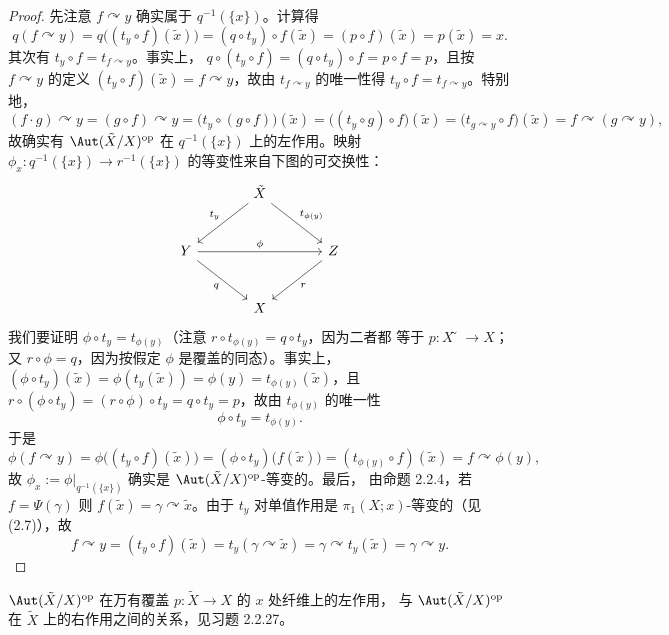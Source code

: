 \begin{proof}
先注意 $f\curvearrowright y$ 确实属于 $q^{-1}(\{x\})$。计算得
\begin{equation}\label{eq:2.11}
q(f\curvearrowright y)
=q\bigl((t_y\circ f)(\tilde x)\bigr)
=(q\circ t_y)\circ f(\tilde x)
=(p\circ f)(\tilde x)=p(\tilde x)=x.
\end{equation}
其次有 $t_y\circ f=t_{f\curvearrowright y}$。事实上，
$q\circ(t_y\circ f)=(q\circ t_y)\circ f=p\circ f=p$，且按 $f\curvearrowright y$ 的定义
$(t_y\circ f)(\tilde x)=f\curvearrowright y$，故由 $t_{f\curvearrowright y}$ 的唯一性得
$t_y\circ f=t_{f\curvearrowright y}$。特别地，
\[
(f\cdot g)\curvearrowright y=(g\circ f)\curvearrowright y
=\bigl(t_y\circ(g\circ f)\bigr)(\tilde x)
=\bigl((t_y\circ g)\circ f\bigr)(\tilde x)
=\bigl(t_{g\curvearrowright y}\circ f\bigr)(\tilde x)
=f\curvearrowright(g\curvearrowright y),
\]
故确实有 $\Aut(\tilde X/X)^{\mathrm{op}}$ 在 $q^{-1}(\{x\})$ 上的左作用。映射
$\phi_x:q^{-1}(\{x\})\to r^{-1}(\{x\})$ 的等变性来自下图的可交换性：
\[
\begin{tikzcd}[column sep=large, row sep=large]
 & \tilde X \arrow[dl, "t_y"'] \arrow[dr, "t_{\phi(y)}"] & \\
 Y \arrow[dr, "q"'] \arrow[rr, "\phi"] & & Z \arrow[dl, "r"]\\
 & X &
\end{tikzcd}
\]
我们要证明 $\phi\circ t_y=t_{\phi(y)}$（注意 $r\circ t_{\phi(y)}=q\circ t_y$，因为二者都
等于 $p:X̃\to X$；又 $r\circ\phi=q$，因为按假定 $\phi$ 是覆盖的同态）。事实上，
$(\phi\circ t_y)(\tilde x)=\phi(t_y(\tilde x))=\phi(y)=t_{\phi(y)}(\tilde x)$，且
$r\circ(\phi\circ t_y)=(r\circ\phi)\circ t_y=q\circ t_y=p$，故由 $t_{\phi(y)}$ 的唯一性
\begin{equation}\label{eq:2.12}
\phi\circ t_y=t_{\phi(y)}.
\end{equation}
于是
\[
\phi(f\curvearrowright y)
=\phi\bigl((t_y\circ f)(\tilde x)\bigr)
=(\phi\circ t_y)\bigl(f(\tilde x)\bigr)
=(t_{\phi(y)}\circ f)(\tilde x)
=f\curvearrowright\phi(y),
\]
故 $\phi_x:=\phi|_{q^{-1}(\{x\})}$ 确实是 $\Aut(\tilde X/X)^{\mathrm{op}}$-等变的。最后，
由命题 2.2.4，若 $f=\Psi(\gamma)$ 则 $f(\tilde x)=\gamma\curvearrowright\tilde x$。由于
$t_y$ 对单值作用是 $\pi_1(X;x)$-等变的（见 (2.7)），故
\[
f\curvearrowright y=(t_y\circ f)(\tilde x)
=t_y(\gamma\curvearrowright\tilde x)
=\gamma\curvearrowright t_y(\tilde x)
=\gamma\curvearrowright y.
\]
\end{proof}

$\Aut(\tilde X/X)^{\mathrm{op}}$ 在万有覆盖 $p:\tilde X\to X$ 的 $x$ 处纤维上的左作用，
与 $\Aut(\tilde X/X)^{\mathrm{op}}$ 在 $\tilde X$ 上的右作用之间的关系，见习题 2.2.27。

